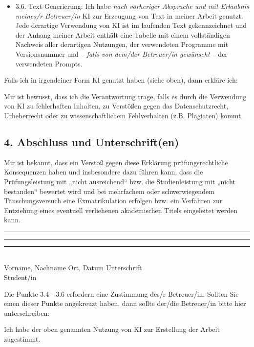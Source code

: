 {\begin{itemize}
            \item[$\square$] 3.6. Text-Generierung: Ich habe \textit{nach vorheriger Absprache und mit Erlaubnis meines/r Betreuer/in} KI zur Erzeugung von Text in meiner Arbeit genutzt. Jede derartige Verwendung von KI ist im laufenden Text gekennzeichnet und der Anhang meiner Arbeit enthält eine Tabelle mit einem vollständigen Nachweis aller derartigen Nutzungen, der verwendeten Programme mit Versionsnummer und \textit{-- falls von dem/der Betreuer/in gewünscht --} der verwendeten Prompts.
        \end{itemize}

        Falls ich in irgendeiner Form KI genutzt haben (siehe oben), dann erkläre ich:\par
        \vspace{0.5em}
        Mir ist bewusst, dass ich die Verantwortung trage, falls es durch die Verwendung von KI zu fehlerhaften Inhalten, zu Verstößen gegen das Datenschutzrecht, Urheberrecht oder zu wissenschaftlichem Fehlverhalten (z.B. Plagiaten) kommt.

        \subsection*{4. Abschluss und Unterschrift(en)}
        Mir ist bekannt, dass ein Verstoß gegen diese Erklärung prüfungsrechtliche Konsequenzen haben und insbesondere dazu führen kann, dass die Prüfungsleistung mit „nicht ausreichend“ bzw. die Studienleistung mit „nicht bestanden“ bewertet wird und bei mehrfachem oder schwerwiegendem Täuschungsversuch eine Exmatrikulation erfolgen bzw. ein Verfahren zur Entziehung eines eventuell verliehenen akademischen Titels eingeleitet werden kann.

        \vspace{1.5cm}
        \noindent
        \rule{5cm}{0.4pt} \hfill \rule{4cm}{0.4pt} \hfill \rule{5cm}{0.4pt} \\
        Vorname, Nachname \hfill Ort, Datum \hfill Unterschrift \\
        Student/in

        \vspace{1cm}
        \noindent
        Die Punkte 3.4 - 3.6 erfordern eine Zustimmung des/r Betreuer/in. Sollten Sie einen dieser Punkte angekreuzt haben, dann sollte der/die Betreuer/in bitte hier unterschreiben:\par
        \vspace{0.5em}
        Ich habe der oben genannten Nutzung von KI zur Erstellung der Arbeit zugestimmt.

}
